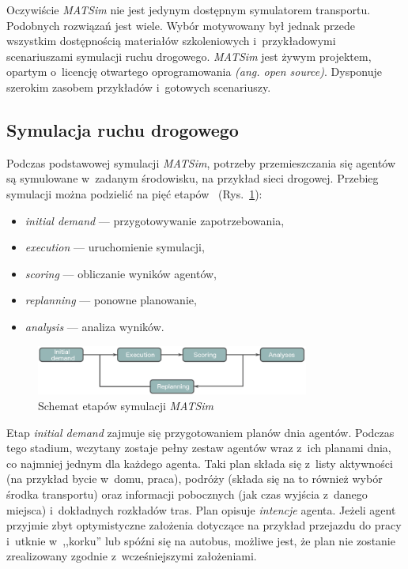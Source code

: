 \documentclass[twoside,12pt]{report}
\begin{document}
Oczywiście \textit{MATSim} nie jest jedynym dostępnym symulatorem transportu. Podobnych rozwiązań jest wiele. Wybór motywowany był jednak przede wszystkim dostępnością materiałów szkoleniowych i~przykładowymi scenariuszami symulacji ruchu drogowego. \textit{MATSim} jest żywym projektem, opartym o~licencję otwartego oprogramowania \textit{(ang. open source)}. Dysponuje szerokim zasobem przykładów i~gotowych scenariuszy. 

\subsection{Symulacja ruchu drogowego}\label{rozdz.symulacja}

Podczas podstawowej symulacji \textit{MATSim}, potrzeby przemieszczania się agentów są symulowane w~zadanym środowisku, na przykład sieci drogowej. Przebieg symulacji można podzielić na pięć etapów~\cite{matsim-userg} (Rys.~\ref{fig:schemat_symulacji}):

\begin{itemize}
\item \textit{initial demand} --- przygotowywanie zapotrzebowania,
\item \textit{execution} --- uruchomienie symulacji,
\item \textit{scoring} --- obliczanie wyników agentów,
\item \textit{replanning} --- ponowne planowanie,
\item \textit{analysis} --- analiza wyników.
\end{itemize}

\begin{figure}[htbp]
	\centering
	\includegraphics[width=0.8\textwidth]{img/simulation_stages}
	\caption{Schemat etapów symulacji \textit{MATSim}}
	\label{fig:schemat_symulacji}
\end{figure}

Etap \textit{initial demand} zajmuje się przygotowaniem planów dnia agentów. Podczas tego stadium, wczytany zostaje pełny zestaw agentów wraz z~ich planami dnia, co najmniej jednym dla każdego agenta. Taki plan składa się z~listy aktywności (na przykład bycie w~domu, praca), podróży (składa się na to również wybór środka transportu) oraz informacji pobocznych (jak czas wyjścia z~danego miejsca) i~dokładnych rozkładów tras. Plan opisuje \textit{intencje} agenta. Jeżeli agent przyjmie zbyt optymistyczne założenia dotyczące na przykład przejazdu do pracy i~utknie w~,,korku'' lub spóźni się na autobus, możliwe jest, że plan nie zostanie zrealizowany zgodnie z~wcześniejszymi założeniami.
\end{document}
